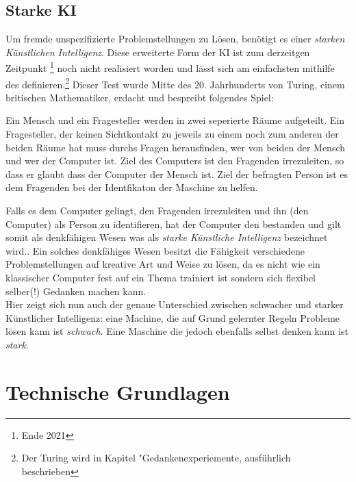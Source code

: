 \documentclass[a4paper,12pt,german,ngerman]{report}
\begin{document}
    \section{Starke KI}
    Um fremde unspezifizierte Problemstellungen zu Lösen, benötigt es einer \emph{starken Künstlichen Intelligenz}.
    Diese erweiterte Form der KI ist zum derzeitgen Zeitpunkt \footnote{Ende 2021} noch nicht realisiert worden und lässt sich am
    einfachsten mithilfe des  definieren.\footnote{Der Turing wird in Kapitel "Gedankenexperiemente, ausführlich beschrieben}
    Dieser Test wurde Mitte des 20. Jahrhunderts von Turing, einem britischen Mathematiker, erdacht und bespreibt folgendes Spiel:
    \begin{displayquote}
        Ein Mensch und ein Fragesteller werden in zwei seperierte
        Räume aufgeteilt. Ein Fragesteller, der keinen Sichtkontakt zu jeweils zu einem noch zum anderen der beiden Räume hat
        muss durchs Fragen herausfinden, wer von beiden der Mensch und wer der Computer ist.
        Ziel des Computers ist den Fragenden irrezuleiten, so dass er glaubt dass der Computer der Mensch ist.
        Ziel der befragten Person ist es dem Fragenden bei der Identfikaton der Maschine zu helfen.\autocite{turing1950computing}
    \end{displayquote}
    Falls es dem Computer gelingt, den Fragenden irrezuleiten und ihn (den Computer) als Person zu identifieren, hat der Computer
    den  bestanden und gilt somit als denkfähigen Wesen was als \emph{starke Künstliche Intelligenz}
    bezeichnet wird.\autocite{oppy&dowe2020turingtest}. Ein solches denkfähiges Wesen besitzt die Fähigkeit verschiedene Problemstellungen
    auf kreative Art und Weise zu lösen, da es nicht wie ein klassischer Computer fest auf ein Thema trainiert ist sondern
    sich flexibel selber(!) Gedanken machen kann.\\

    Hier zeigt sich nun auch der genaue Unterschied zwischen schwacher und starker Künstlicher Intelligenz: eine Machine,
    die auf Grund gelernter Regeln Probleme lösen kann ist \emph{schwach}. Eine Maschine die jedoch ebenfalls selbst denken
    kann ist \emph{stark}.

    \chapter{Technische Grundlagen}
\end{document}
